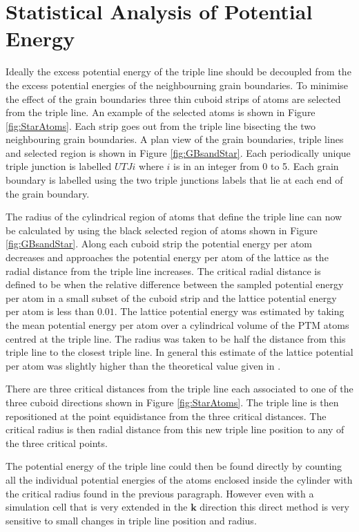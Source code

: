 \documentclass[12pt,a4paper]{book}
\begin{document}
\section{Statistical Analysis of Potential Energy}


Ideally the excess potential energy of the triple line should be decoupled from the the excess potential energies of the neighbourning grain boundaries. To minimise the effect of the grain boundaries three thin cuboid strips of atoms are selected from the triple line. An example of the selected atoms is shown in Figure \ref{fig:StarAtoms}. Each strip goes out from the triple line bisecting the two neighbouring grain boundaries. A plan view of the grain boundaries, triple lines and selected region is shown in Figure \ref{fig:GBsandStar}. Each periodically unique triple junction is labelled $UTJi$ where $i$ is in an integer from 0 to 5. Each grain boundary is labelled using the two triple junctions labels that lie at each end of the grain boundary.

The radius of the cylindrical region of atoms that define the triple line can now be calculated by using the black selected region of atoms shown in Figure \ref{fig:GBsandStar}. Along each cuboid strip the potential energy per atom decreases and approaches the potential energy per atom of the lattice as the radial distance from the triple line increases. The critical radial distance is defined to be when the relative difference  between the sampled potential energy per atom in a small subset of the cuboid strip and the lattice potential energy per atom is less than $0.01$. The lattice potential energy was estimated by taking the mean potential energy per atom over a cylindrical volume of the PTM atoms centred at the triple line. The radius was taken to be half the distance from this triple line to the closest triple line. In general this estimate of the lattice potential per atom was slightly higher than the theoretical value given in \cite{Zope2003}.

There are three critical distances from the triple line each associated to one of the three cuboid directions shown in Figure \ref{fig:StarAtoms}. The triple line is then repositioned at the point equidistance from the three critical distances. The critical radius is then radial distance from this new triple line position to any of the three critical points.       

The potential energy of the triple line could then be found directly by counting all the individual potential energies of the atoms enclosed inside the cylinder with the critical radius found in the previous paragraph. However even with a simulation cell that is very extended in the $\mathbf{k}$ direction this direct method is very sensitive to small changes in triple line position and radius.
\end{document}
